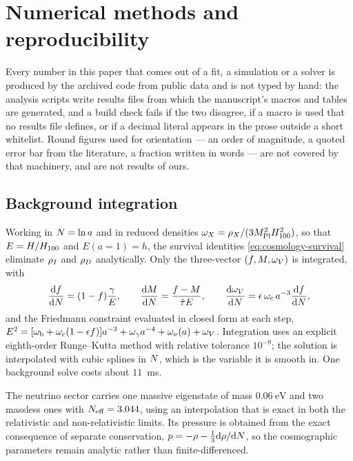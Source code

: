 \section{Numerical methods and reproducibility}\label{app:numerics}

Every number in this paper that comes out of a fit, a simulation or a solver is
produced by the archived code from public data and is not typed by hand: the
analysis scripts write results files from which the manuscript's macros and
tables are generated, and a build check fails if the two disagree, if a macro
is used that no results file defines, or if a decimal literal appears in the
prose outside a short whitelist. Round figures used for orientation --- an
order of magnitude, a quoted error bar from the literature, a fraction written
in words --- are not covered by that machinery, and are not results of ours.

\subsection{Background integration}\label{app:numerics-background}

Working in $N=\ln a$ and in reduced densities
$\omega_X=\rho_X/(3M_{\mathrm{Pl}}^2 H_{100}^2)$, so that $E=H/H_{100}$ and $E(a{=}1)=h$,
the survival identities \cref{eq:cosmology-survival} eliminate $\rho_{I}$ and
$\rho_{D}$ analytically. Only the three-vector $(f,M,\omega_V)$ is
integrated, with
%
\begin{equation}\label{eq:numerics-system}
  \frac{\mathrm{d} f}{\mathrm{d} N}=(1-f)\frac{\gamma}{E},
  \qquad
  \frac{\mathrm{d} M}{\mathrm{d} N}=\frac{f-M}{\hat\tau E},
  \qquad
  \frac{\mathrm{d} \omega_V}{\mathrm{d} N}=\epsilon\,\omega_c\,a^{-3}\frac{\mathrm{d} f}{\mathrm{d} N} ,
\end{equation}
%
and the Friedmann constraint evaluated in closed form at each step,
$E^2=[\omega_{\rm b}+\omega_c(1-\epsilon f)]a^{-3}+\omega_\gamma
a^{-4}+\omega_\nu(a)+\omega_V$. Integration uses an explicit
eighth-order Runge--Kutta method with relative tolerance $10^{-9}$; the
solution is interpolated with cubic splines in $N$, which is the variable
it is smooth in. One background solve costs about $11$~ms.

The neutrino sector carries one massive eigenstate of mass
$\SI{0.06}{\electronvolt}$ and two massless ones with
$N_{\rm eff}=3.044$, using an interpolation that is exact in both the
relativistic and non-relativistic limits. Its pressure is obtained from the
exact consequence of separate conservation, $p=-\rho-\tfrac13\mathrm{d}\rho/\mathrm{d}N$,
so the cosmographic parameters remain analytic rather than
finite-differenced.


